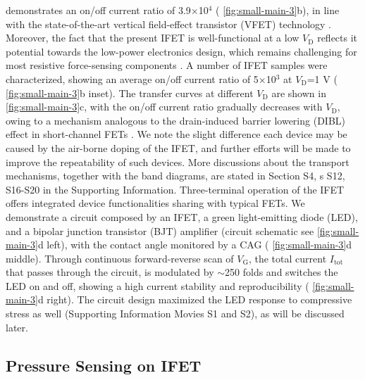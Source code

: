 demonstrates an on/off current ratio of 3.9\(\times\)10\(^{\text{4}}\) (
\autoref{fig:small-main-3}b), in line with the state-of-the-art vertical
field-effect transistor (VFET) technology
\cite{Yang_2012_Barristor,Shih_2015_PartiallyScreened,Sun_2017_COF_VFET,Ben_Sasson_2014_fet_rev}. Moreover,
the fact that the present IFET is well-functional at a low
\(V_{\mathrm{D}}\) reflects it potential towards the low-power
electronics design, which remains challenging for most resistive
force-sensing components \cite{Pan_2014_pressure,Pang_2012_gauge}. A number of IFET
samples were characterized, showing an average on/off current ratio
of 5\(\times\)10\(^{\text{3}}\) at \(V_{\mathrm{D}}\)=1 V (
\autoref{fig:small-main-3}b inset). The transfer curves at different
\(V_{\mathrm{D}}\) are shown in  \autoref{fig:small-main-3}c, with the on/off
current ratio gradually decreases with \(V_{\mathrm{D}}\), owing to a
mechanism analogous to the drain-induced barrier lowering (DIBL)
effect in short-channel FETs \cite{Lundstrom_2003_moore}. We note the slight
difference each device may be caused by the air-borne doping of the
IFET, and further efforts will be made to improve the repeatability
of such devices. More discussions about the transport mechanisms,
together with the band diagrams, are stated in Section S4, s
S12, S16-S20 in the Supporting Information. Three-terminal operation
of the IFET offers integrated device functionalities sharing with
typical FETs. We demonstrate a circuit composed by an IFET, a green
light-emitting diode (LED), and a bipolar junction transistor (BJT)
amplifier (circuit schematic see  \autoref{fig:small-main-3}d left), with
the contact angle monitored by a CAG ( \autoref{fig:small-main-3}d
middle). Through continuous forward-reverse scan of \(V_{\mathrm{G}}\),
the total current \(I_{\mathrm{tot}}\) that passes through the circuit,
is modulated by \(\sim\)250 folds and switches the LED on and off,
showing a high current stability and reproducibility (
\autoref{fig:small-main-3}d right). The circuit design maximized the LED response
to compressive stress as well (Supporting Information Movies S1 and S2), as
will be discussed later.

\subsection{Pressure Sensing on IFET}
\label{sec:press-sens-ifet}


